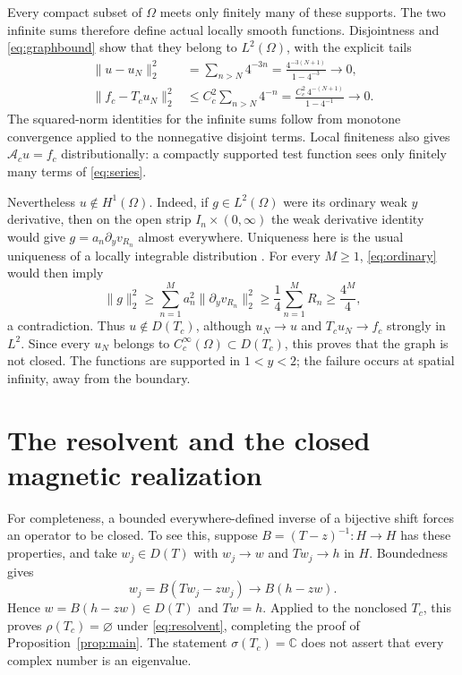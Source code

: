 \documentclass[11pt,a4paper]{article}
\begin{document}
Every compact subset of $\Omega$ meets only finitely many of these supports.
The two infinite sums therefore define actual locally smooth functions.
Disjointness and \eqref{eq:graphbound} show that they belong to $L^2(\Omega)$,
with the explicit tails
\begin{align}
 \|u-u_N\|_2^2
 &=\sum_{n>N}4^{-3n}
   =\frac{4^{-3(N+1)}}{1-4^{-3}}\longrightarrow0,
 \label{eq:utail}\\
 \|f_c-T_cu_N\|_2^2
 &\leq C_c^2\sum_{n>N}4^{-n}
   =\frac{C_c^2\,4^{-(N+1)}}{1-4^{-1}}\longrightarrow0.
 \label{eq:ftail}
\end{align}
The squared-norm identities for the infinite sums follow from monotone
convergence applied to the nonnegative disjoint terms.
Local finiteness also gives $\mathcal A_cu=f_c$ distributionally: a compactly
supported test function sees only finitely many terms of \eqref{eq:series}.

Nevertheless $u\notin H^1(\Omega)$. Indeed, if $g\in L^2(\Omega)$ were its
ordinary weak $y$ derivative, then on the open strip $I_n\times(0,\infty)$
the weak derivative identity would give
$g=a_n\partial_yv_{R_n}$ almost everywhere. Uniqueness here is the usual
uniqueness of a locally integrable distribution
\cite[Corollary~4.24]{Brezis}.
For every $M\geq1$, \eqref{eq:ordinary} would then imply
\begin{equation}
 \|g\|_2^2\geq
 \sum_{n=1}^M a_n^2\|\partial_yv_{R_n}\|_2^2
 \geq\frac14\sum_{n=1}^M R_n
 \geq\frac{4^M}{4},
 \label{eq:divergence}
\end{equation}
a contradiction. Thus $u\notin D(T_c)$, although
$u_N\to u$ and $T_cu_N\to f_c$ strongly in $L^2$.
Since every $u_N$ belongs to $C_c^\infty(\Omega)\subset D(T_c)$, this proves
that the graph is not closed. The functions are supported in $1<y<2$; the
failure occurs at spatial infinity, away from the boundary.

\section{The resolvent and the closed magnetic realization}
\label{sec:consequences}

For completeness, a bounded everywhere-defined inverse of a bijective shift
forces an operator to be closed. To see this, suppose $B=(T-z)^{-1}:H\to H$
has these properties, and take $w_j\in D(T)$ with
$w_j\to w$ and $Tw_j\to h$ in $H$. Boundedness gives
\[
 w_j=B(Tw_j-zw_j)\longrightarrow B(h-zw).
\]
Hence $w=B(h-zw)\in D(T)$ and $Tw=h$.
Applied to the nonclosed $T_c$, this proves $\rho(T_c)=\varnothing$ under
\eqref{eq:resolvent}, completing the proof of Proposition~\ref{prop:main}.
The statement $\sigma(T_c)=\mathbb C$ does not assert that every complex
number is an eigenvalue.
\end{document}
